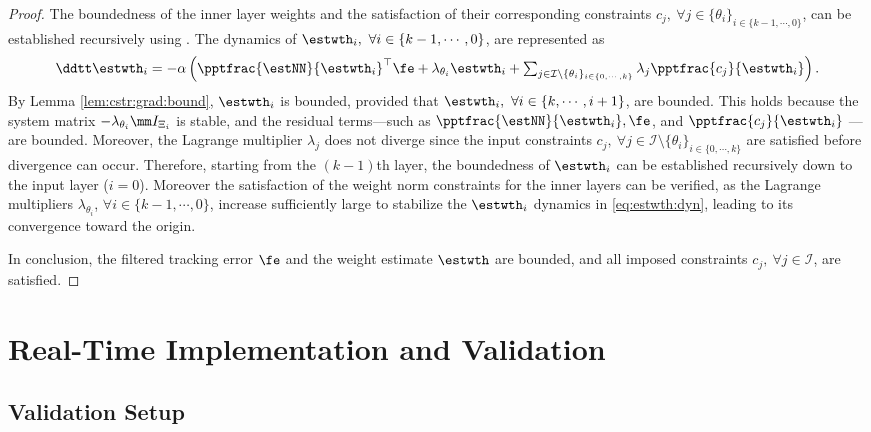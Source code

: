 \documentclass[letterpaper, journal]{IEEEtran}
\begin{document}
\begin{proof}
\hfill 

The boundedness of the inner layer weights and the satisfaction of their corresponding constraints $c_j,\ \forall j\in\{\theta_i\}_{i\in\{k-1,\cdots,0\}}$, can be established recursively using \cite[Chap.~4, Thm.~1.9]{Desoer:2009aa}.
The dynamics of $\estwth_i,\ \forall i\in\{k-1,\cdots,0\}$, are represented as
\begin{equation}
    \ddtt \estwth_i 
    =
    -\alpha
    \left(
        {\pptfrac{\estNN}{\estwth_i}}^\top
        \fe
        +
        \lambda_{\theta_i}\estwth_i
        +
        \textstyle\sum_{
            j\in\mathcal{I}\setminus \{\theta_i\}_{i\in\{0,\cdots,k\}}
        }
        \lambda_j
        \pptfrac{c_j}{\estwth_i}
    \right)
    .
    \label{eq:estwth:dyn}
\end{equation}
By Lemma \ref{lem:cstr:grad:bound}, $\estwth_i$ is bounded, provided that $\estwth_i,\ \forall i\in\{k,\cdots,i+1\}$, are bounded. 
This holds because the system matrix $-\lambda_{\theta_i} \mm I_{\Xi_i}$ is stable, and the residual terms—such as $\pptfrac{\estNN}{\estwth_i}, \fe$, and $\pptfrac{c_j}{\estwth_i}$ —are bounded.
Moreover, the Lagrange multiplier $\lambda_j$ does not diverge since the input constraints $c_j,\ \forall j\in\mathcal{I}\setminus \{\theta_i\}_{i\in\{0,\cdots,k\}}$ are satisfied before divergence can occur.
Therefore, starting from the $(k-1)$th layer, the boundedness of $\estwth_i$ can be established recursively down to the input layer ($i=0$).
Moreover the satisfaction of the weight norm constraints for the inner layers can be verified, as the Lagrange multipliers $\lambda_{\theta_i}$, $\forall i\in\{k-1,\cdots,0\}$, increase sufficiently large to stabilize the $\estwth_i$ dynamics in \eqref{eq:estwth:dyn}, leading to its convergence toward the origin.

\hfill

In conclusion, the filtered tracking error $\fe$ and the weight estimate $\estwth$ are bounded, and all imposed constraints $c_j,\ \forall j\in\mathcal I$, are satisfied.

\end{proof}

\section{Real-Time Implementation and Validation}\label{sec:sim}

\subsection{Validation Setup}
\end{document}
